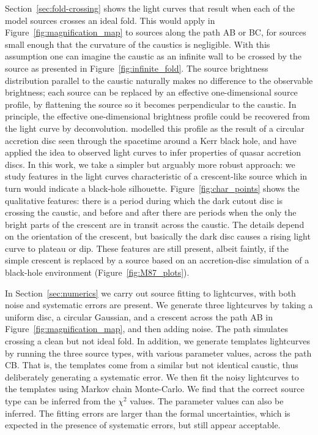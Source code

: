 \documentclass[usenatbib]{mn2e}
\begin{document}
Section~\ref{sec:fold-crossing} shows the light curves that result
when each of the model sources crosses an ideal fold.  This would
apply in Figure~\ref{fig:magnification_map} to sources along the path
AB or BC, for sources small enough that the curvature of the caustics
is negligible.  With this assumption one can imagine the caustic as an
infinite wall to be crossed by the source as presented in
Figure~\ref{fig:infinite_fold}.  The source brightness distribution
parallel to the caustic naturally makes no difference to the
observable brightness; each source can be replaced by an effective
one-dimensional source profile, by flattening the source so it becomes
perpendicular to the caustic.  In principle, the effective
one-dimensional brightness profile could be recovered from the light
curve by deconvolution.  \cite{1999ApJ...524...49A} modelled this
profile as the result of a circular accretion disc seen through the
spacetime around a Kerr black hole, and \cite{2012MNRAS.423..676A}
have applied the idea to observed light curves to infer properties of
quasar accretion discs.  In this work, we take a simpler but arguably
more robust approach: we study features in the light curves
characteristic of a crescent-like source which in turn would indicate
a black-hole silhouette.  Figure~\ref{fig:char_points} shows the
qualitative features: there is a period during which the dark cutout
disc is crossing the caustic, and before and after there are periods
when the only the bright parts of the crescent are in transit across
the caustic.  The details depend on the orientation of the crescent,
but basically the dark disc causes a rising light curve to plateau or
dip.  These features are still present, albeit faintly, if the simple
crescent is replaced by a source based on an accretion-disc simulation
of a black-hole environment
(Figure~\ref{fig:M87_plots}).


In Section~\ref{sec:numerics} we carry out source fitting to
lightcurves, with both noise and systematic errors are present.  We
generate three lightcurves by taking a uniform disc, a circular
Gaussian, and a crescent across the path AB in
Figure~\ref{fig:magnification_map}, and then adding noise.  The path
simulates crossing a clean but not ideal fold.  In addition, we
generate templates lightcurves by running the three source types, with
various parameter values, across the path CB.  That is, the templates
come from a similar but not identical caustic, thus deliberately
generating a systematic error.  We then fit the noisy lightcurves to
the templates using Markov chain Monte-Carlo.  We find that the
correct source type can be inferred from the $\chi^2$ values.  The
parameter values can also be inferred. The fitting errors are larger
than the formal uncertainties, which is expected in the presence of
systematic errors, but still appear acceptable.
\end{document}

